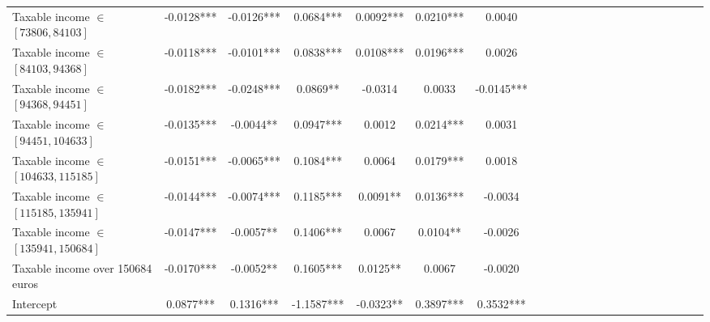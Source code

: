 \begin{subappendices}
{\begin{landscape}
\begin{table}[H]
{\begin{tabular}{lccccccccccccccccccccc}
Taxable income $\in$ $[73806,84103]$              & -0.0128***              &     -0.0126***             &   0.0684***                    &  0.0092***                   &                   0.0210***      &       0.0040                               \\
Taxable income $\in$ $[84103,94368]$              & -0.0118***              &     -0.0101***             &   0.0838***                    &  0.0108***                   &                   0.0196***      &       0.0026                               \\
Taxable income $\in$ $[94368,94451]$              & -0.0182***              &     -0.0248***             &   0.0869**                     &  -0.0314                     &                   0.0033         &       -0.0145***                           \\
Taxable income $\in$ $[94451,104633]$             & -0.0135***              &     -0.0044**              &   0.0947***                    &  0.0012                      &                   0.0214***      &       0.0031                               \\
Taxable income $\in$ $[104633,115185]$            & -0.0151***              &     -0.0065***             &   0.1084***                    &  0.0064                      &                   0.0179***      &       0.0018                               \\
Taxable income $\in$ $[115185,135941]$            & -0.0144***              &     -0.0074***             &   0.1185***                    &  0.0091**                    &                   0.0136***      &       -0.0034                              \\
Taxable income $\in$ $[135941,150684]$            & -0.0147***              &     -0.0057**              &   0.1406***                    &  0.0067                      &                   0.0104**       &       -0.0026                              \\
Taxable income over 150684 euros                  & -0.0170***              &     -0.0052**              &   0.1605***                    &  0.0125**                    &                   0.0067         &       -0.0020                              \\
\midrule
Intercept                                         & 0.0877***               &     0.1316***              &   -1.1587***                   &  -0.0323**                   &                   0.3897***      &       0.3532***                            \\

\end{tabular}}
\end{table}
\end{landscape}}
\end{subappendices}
